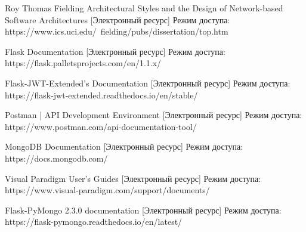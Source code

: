 \begingroup 
\renewcommand{\section}[2]{\anonsection{список использованных источников}}
\begin{thebibliography}{00}
	
Roy Thomas Fielding
Architectural Styles and the Design of Network-based Software Architectures
[Электронный ресурс] 
Режим доступа: https://www.ics.uci.edu/~fielding/pubs/dissertation/top.htm


Flask Documentation
[Электронный ресурс] 
Режим доступа:
https://flask.palletsprojects.com/en/1.1.x/

Flask-JWT-Extended’s Documentation
[Электронный ресурс] 
Режим доступа:
https://flask-jwt-extended.readthedocs.io/en/stable/

Postman | API Development Environment
[Электронный ресурс]
Режим доступа:
https://www.postman.com/api-documentation-tool/

MongoDB Documentation 
[Электронный ресурс]
Режим доступа:
https://docs.mongodb.com/

Visual Paradigm User's Guides
[Электронный ресурс]
Режим доступа:
https://www.visual-paradigm.com/support/documents/

Flask-PyMongo 2.3.0 documentation
[Электронный ресурс]
Режим доступа:
https://flask-pymongo.readthedocs.io/en/latest/

\end{thebibliography}
\endgroup

\clearpage